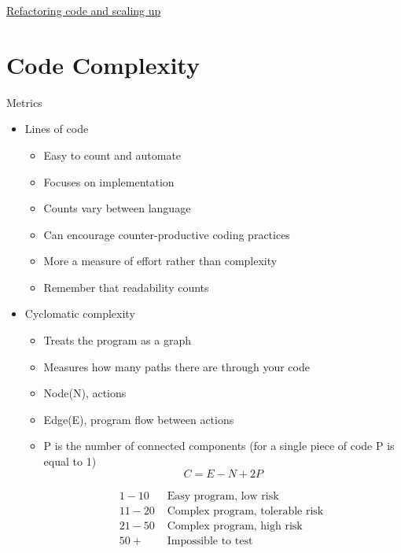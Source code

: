 \documentclass{article}[18pt]
\begin{document}
\begin{center}
\underline{\huge Refactoring code and scaling up}
\end{center}
\section{Code Complexity}
Metrics
\begin{itemize}
	\item Lines of code
	\begin{itemize}
		\item Easy to count and automate
		\item Focuses on implementation
		\item Counts vary between language
		\item Can encourage counter-productive coding practices
		\item More a measure of effort rather than complexity
		\item Remember that readability counts
	\end{itemize}
	\item Cyclomatic complexity
	\begin{itemize}
		\item Treats the program as a graph
		\item Measures how many paths there are through your code
		\item Node(N), actions
		\item Edge(E), program flow between actions
		\item P is the number of connected components (for a single piece of code P is equal to 1)
		$$C=E-N+2P$$
		
		\[
		\begin{array}{ll}
		{1-10} & {\text { Easy program, low risk }} \\
		{11-20} & {\text { Complex program, tolerable risk }} \\
		{21-50} & {\text { Complex program, high risk }} \\
		{50+} & {\text { Impossible to test }}
		\end{array}
		\]
		

\end{itemize}
\end{itemize}
\end{document}
